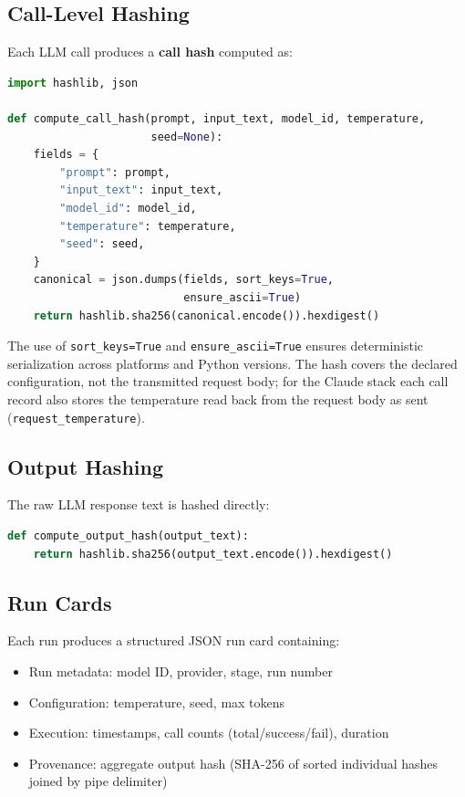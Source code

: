 \documentclass[11pt]{article}
\begin{document}
\subsection{Call-Level Hashing}

Each LLM call produces a \textbf{call hash} computed as:

\begin{lstlisting}[language=Python,caption={Call hash computation (\texttt{src/provenance/hasher.py})}]
import hashlib, json

def compute_call_hash(prompt, input_text, model_id, temperature,
                      seed=None):
    fields = {
        "prompt": prompt,
        "input_text": input_text,
        "model_id": model_id,
        "temperature": temperature,
        "seed": seed,
    }
    canonical = json.dumps(fields, sort_keys=True,
                           ensure_ascii=True)
    return hashlib.sha256(canonical.encode()).hexdigest()
\end{lstlisting}

The use of \texttt{sort\_keys=True} and \texttt{ensure\_ascii=True} ensures deterministic serialization across platforms and Python versions. The hash covers the declared configuration, not the transmitted request body; for the Claude stack each call record also stores the temperature read back from the request body as sent (\texttt{request\_temperature}).

\subsection{Output Hashing}

The raw LLM response text is hashed directly:

\begin{lstlisting}[language=Python]
def compute_output_hash(output_text):
    return hashlib.sha256(output_text.encode()).hexdigest()
\end{lstlisting}

\subsection{Run Cards}

Each run produces a structured JSON run card containing:
\begin{itemize}
  \item Run metadata: model ID, provider, stage, run number
  \item Configuration: temperature, seed, max tokens
  \item Execution: timestamps, call counts (total/success/fail), duration
  \item Provenance: aggregate output hash (SHA-256 of sorted individual hashes joined by pipe delimiter)
\end{itemize}
\end{document}
